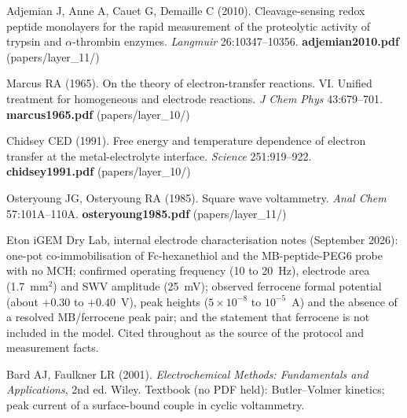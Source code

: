 \documentclass[10pt,a4paper]{article}
\numberwithin{equation}{section}
\begin{document}
\begin{enumerate}[label={[\arabic*]},noitemsep,leftmargin=*]
\item Adjemian J, Anne A, Cauet G, Demaille C (2010). Cleavage-sensing redox peptide
  monolayers for the rapid measurement of the proteolytic activity of trypsin
  and $\alpha$-thrombin enzymes.
  \textit{Langmuir} 26:10347--10356. \textbf{adjemian2010.pdf} (papers/layer\_11/)

\item Marcus RA (1965). On the theory of electron-transfer reactions. VI.
  Unified treatment for homogeneous and electrode reactions.
  \textit{J Chem Phys} 43:679--701. \textbf{marcus1965.pdf} (papers/layer\_10/)

\item Chidsey CED (1991). Free energy and temperature dependence of electron
  transfer at the metal-electrolyte interface.
  \textit{Science} 251:919--922. \textbf{chidsey1991.pdf} (papers/layer\_10/)

\item Osteryoung JG, Osteryoung RA (1985). Square wave voltammetry.
  \textit{Anal Chem} 57:101A--110A. \textbf{osteryoung1985.pdf} (papers/layer\_11/)

\item Eton iGEM Dry Lab, internal electrode characterisation notes (September
  2026): one-pot co-immobilisation of Fc-hexanethiol and the MB-peptide-PEG6 probe with no
  MCH; confirmed operating frequency (10 to 20~Hz), electrode area (1.7~mm$^2$) and SWV
  amplitude (25~mV); observed ferrocene formal potential (about $+0.30$ to $+0.40$~V), peak heights
  ($5\times10^{-8}$ to $10^{-5}$~A) and the absence of a resolved MB/ferrocene peak pair; and
  the statement that ferrocene is not included in the model. Cited throughout as the source of
  the protocol and measurement facts.

\item Bard AJ, Faulkner LR (2001). \textit{Electrochemical Methods: Fundamentals and Applications}, 2nd ed.
  Wiley. Textbook (no PDF held): Butler--Volmer kinetics; peak current of a surface-bound couple in cyclic voltammetry.
\end{enumerate}
\end{document}
